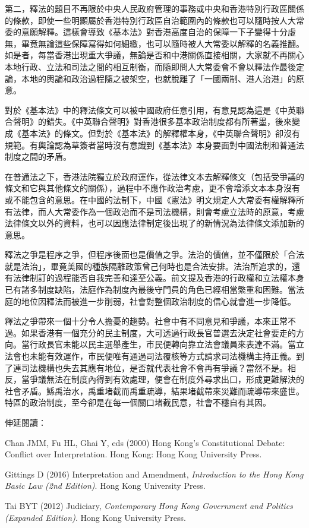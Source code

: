第二，釋法的題目不再限於中央人民政府管理的事務或中央和香港特別行政區關係的條款，即使一些明顯屬於香港特別行政區自治範圍內的條款也可以隨時按人大常委的意願解釋。這樣會導致《基本法》對香港高度自治的保障一下子變得十分虛無，畢竟無論這些保障寫得如何細緻，也可以隨時被人大常委以解釋的名義推翻。如是者，每當香港出現重大爭議，無論是否和中港關係直接相關，大家就不再關心本地行政、立法和司法之間的相互制衡，而隨即問人大常委會不會以釋法作最後定論，本地的輿論和政治過程隨之被架空，也就脫離了「一國兩制、港人治港」的原意。

對於《基本法》中的釋法條文可以被中國政府任意引用，有意見認為這是《中英聯合聲明》的錯失。《中英聯合聲明》對香港很多基本政治制度都有所著墨，後來變成《基本法》的條文。但對於《基本法》的解釋權本身，《中英聯合聲明》卻沒有規範。有輿論認為草簽者當時沒有意識到《基本法》本身要面對中國法制和普通法制度之間的矛盾。

在普通法之下，香港法院獨立於政府運作，從法律文本去解釋條文（包括受爭議的條文和它與其他條文的關係），過程中不應作政治考慮，更不會增添文本本身沒有或不能包含的意思。在中國的法制下，中國《憲法》明文規定人大常委有權解釋所有法律，而人大常委作為一個政治而不是司法機構，則會考慮立法時的原意，考慮法律條文以外的資料，也可以因應法律制定後出現了的新情況為法律條文添加新的意思。

釋法之爭是程序之爭，但程序後面也是價值之爭。法治的價值，並不僅限於「合法就是法治」，畢竟美國的種族隔離政策曾己何時也是合法安排。法治所追求的，還有法律制訂的過程能否自我完善和達至公義。前文提及香港的行政權和立法權本身已有諸多制度缺陷，法庭作為制度內最後守門員的角色已經相當繁重和困難。當法庭的地位因釋法而被進一步削弱，社會對整個政治制度的信心就會進一步降低。

釋法之爭帶來一個十分令人擔憂的趨勢。社會中有不同意見和爭議，本來正常不過。如果香港有一個充分的民主制度，大可透過行政長官普選去決定社會要走的方向。當行政長官未能以民主選舉產生，市民便轉向靠立法會議員來表達不滿。當立法會也未能有效運作，市民便唯有通過司法覆核等方式請求司法機構主持正義。到了連司法機構也失去其應有地位，是否就代表社會不會再有爭議？當然不是。相反，當爭議無法在制度內得到有效處理，便會在制度外尋求出口，形成更難解決的社會矛盾。鯀禹治水，禹重堵截而禹重疏導，結果堵截帶來災難而疏導帶來盛世。特區的政治制度，至今卻是在每一個關口堵截民意，社會不穩自有其因。



伸延閱讀：

Chan JMM, Fu HL, Ghai Y, eds (2000) Hong Kong's Constitutional Debate: Conflict over Interpretation. Hong Kong: Hong Kong University Press.

Gittings D (2016) Interpretation and Amendment, \textit{Introduction to the Hong Kong Basic Law (2nd Edition)}. Hong Kong University Press.

Tai BYT (2012) Judiciary, \textit{Contemporary Hong Kong Government and Politics (Expanded Edition)}. Hong Kong University Press.